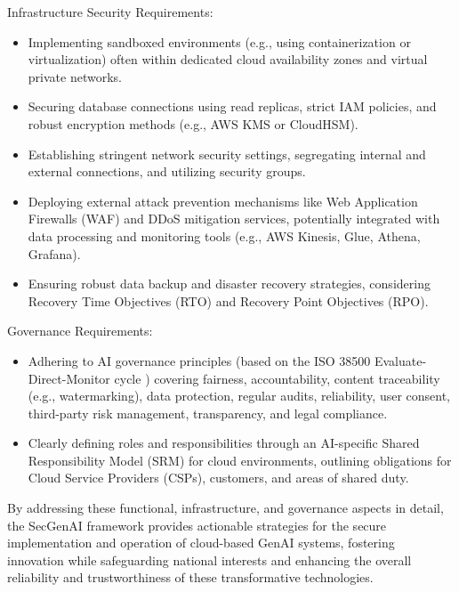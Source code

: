 Infrastructure Security Requirements:
\begin{itemize}
    \item Implementing sandboxed environments (e.g., using containerization or virtualization) often within dedicated cloud availability zones and virtual private networks\cite{haryanto_secgenai_2024}.
    \item Securing database connections using read replicas, strict IAM policies, and robust encryption methods (e.g., AWS KMS or CloudHSM)\cite{haryanto_secgenai_2024}.
    \item Establishing stringent network security settings, segregating internal and external connections, and utilizing security groups\cite{haryanto_secgenai_2024}.
    \item Deploying external attack prevention mechanisms like Web Application Firewalls (WAF) and DDoS mitigation services, potentially integrated with data processing and monitoring tools (e.g., AWS Kinesis, Glue, Athena, Grafana)\cite{haryanto_secgenai_2024}.
    \item Ensuring robust data backup and disaster recovery strategies, considering Recovery Time Objectives (RTO) and Recovery Point Objectives (RPO)\cite{haryanto_secgenai_2024}.
\end{itemize}

Governance Requirements:
\begin{itemize}
    \item Adhering to AI governance principles (based on the ISO 38500 Evaluate-Direct-Monitor cycle \cite{noauthor_isoiec_nodate}) covering fairness, accountability, content traceability (e.g., watermarking), data protection, regular audits, reliability, user consent, third-party risk management, transparency, and legal compliance\cite{haryanto_secgenai_2024}.
    \item Clearly defining roles and responsibilities through an AI-specific Shared Responsibility Model (SRM) for cloud environments, outlining obligations for Cloud Service Providers (CSPs), customers, and areas of shared duty\cite{haryanto_secgenai_2024}.
\end{itemize}

By addressing these functional, infrastructure, and governance aspects in detail, the SecGenAI framework provides actionable strategies for the secure implementation and operation of cloud-based GenAI systems, fostering innovation while safeguarding national interests and enhancing the overall reliability and trustworthiness of these transformative technologies\cite{haryanto_secgenai_2024}.

